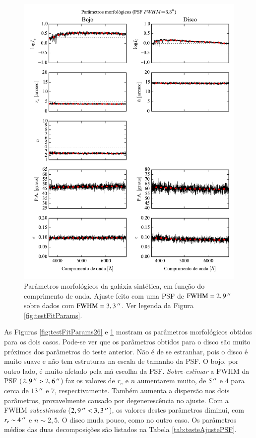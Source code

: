 \begin{figure}
	\includegraphics{figuras/simulation_fitparams_psf33}
	\caption[Parâmetros morfológicos (teste com PSF $\mathrm{FWHM} =
	3,3\,\arcs$)] {Parâmetros morfológicos da galáxia sintética, em função do comprimento de
	onda. Ajuste feito com uma PSF de $\mathrm{FWHM} = 2,9\,^{\prime\prime}$ sobre
	dados com $\mathrm{FWHM} = 3,3\,\arcs$. Ver legenda da Figura
	\ref{fig:testFitParams}.}
	\label{fig:testFitParams33}
\end{figure}

As Figuras \ref{fig:testFitParams26} e \ref{fig:testFitParams33} mostram os
parâmetros morfológicos obtidos para os dois casos. Pode-se ver que os
parâmetros obtidos para o disco são muito próximos dos parâmetros do teste
anterior. Não é de se estranhar, pois o disco é muito suave e não tem estruturas
na escala de tamanho da PSF. O bojo, por outro lado, é muito afetado pela má
escolha da PSF. {\em Sobre-estimar} a FWHM da PSF ($2,9\,^{\prime\prime} > 2,6\,^{\prime\prime}$)
faz os valores de $r_e$ e $n$ aumentarem muito, de $5\,^{\prime\prime}$ e $4$ para cerca
de $13\,^{\prime\prime}$ e $7$, respectivamente. Também aumenta a dispersão nos dois
parâmetros, provavelmente causado por degenerescência no ajuste. Com a FWHM {\em
subestimada} ($2,9\,^{\prime\prime} < 3,3\,^{\prime\prime}$), os valores destes parâmetros diminui,
com $r_e \sim 4\,^{\prime\prime}$ e $n \sim 2,5$. O disco muda pouco, como no outro caso.
Os parâmetros médios das duas decomposições são listados na Tabela
\ref{tab:testeAjustePSF}.

